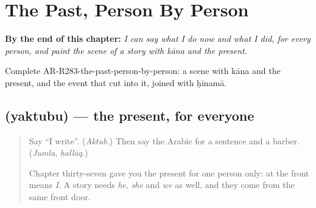 
\chapter{The Past, Person By Person}
\label{ch:ar-the-past-person-by-person}

\begin{chapteropening}
\textbf{By the end of this chapter:} \emph{I can say what I do now and what I did, for every person, and paint the scene of a story with kāna and the present.}

Complete AR-R283-the-past-person-by-person: a scene with kāna and the present, and the event that cut into it, joined with ḥīnamā.
\end{chapteropening}

\section[\texorpdfstring{\ar{يكتب} (yaktubu)}{يكتب (yaktubu)}]{ (yaktubu) — the present, for everyone}

\label{lesson:AR-C283-yaktubu}



\begin{quote}
Say \textquotedblleft{}I write\textquotedblright{}. (\emph{Aktub.}) Then say the Arabic for a sentence and a barber. (\emph{Jumla}, \emph{ḥallāq}.)

Chapter thirty-seven gave you the present for one person only: \textbf{} at the front means \emph{I}. A story needs \emph{he}, \emph{she} and \emph{we} as well, and they come from the same front door.
\end{quote}

